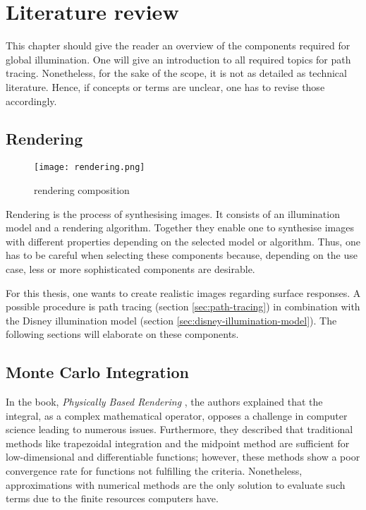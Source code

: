 \chapter{Literature review}

This chapter should give the reader an overview of the components required for global illumination.
One will give an introduction to all required topics for path tracing. Nonetheless, for the sake of the scope, it is not as detailed as technical literature. 
Hence, if concepts or terms are unclear, one has to revise those accordingly.

\section{Rendering}

\begin{figure}[h]
\centering
\texttt{[image: rendering.png]}
\caption[]{rendering composition \cite{duin_beleuchtungsalgorithmen_1993}}
\label{fig:rendering}
\end{figure}

Rendering is the process of synthesising images. 
It consists of an illumination model and a rendering algorithm.
Together they enable one to synthesise images with different properties depending on the selected model or algorithm.
Thus, one has to be careful when selecting these components because, depending on the use case, less or more sophisticated components are desirable.

For this thesis, one wants to create realistic images regarding surface responses.
A possible procedure is path tracing (section \ref{sec:path-tracing}) in combination with the Disney illumination model (section \ref{sec:disney-illumination-model}).
The following sections will elaborate on these components.

\section{Monte Carlo Integration}

In the book, \textit{Physically Based Rendering} \cite{pharr_physically_2017}, the authors explained that the integral, as a complex mathematical operator, opposes a challenge in computer science leading to numerous issues. 
Furthermore, they described that traditional methods like trapezoidal integration and the midpoint method are sufficient for low-dimensional and differentiable functions; however, these methods show a poor convergence rate for functions not fulfilling the criteria.
Nonetheless, approximations with numerical methods are the only solution to evaluate such terms due to the finite resources computers have.

